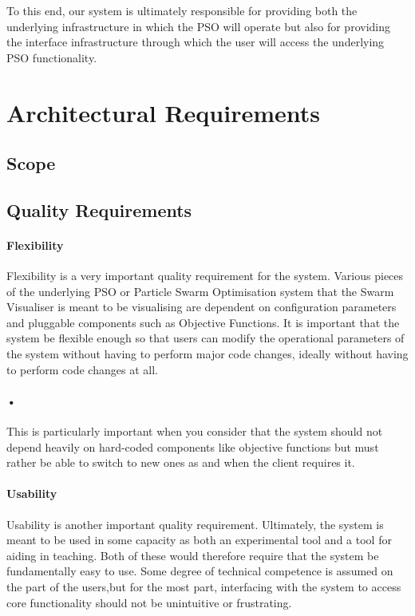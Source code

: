 \documentclass[11pt]{article}
\begin{document}
To this end, our system is ultimately responsible for providing both the underlying infrastructure in which the PSO will operate but also for providing the interface infrastructure through which the user will access the underlying PSO functionality.


\section{Architectural Requirements}
\subsection{Scope}
\subsection{Quality Requirements}

\paragraph{Flexibility}
Flexibility is a very important quality requirement for the system. Various pieces of the underlying PSO or Particle Swarm Optimisation system that the Swarm Visualiser is meant to be visualising are dependent on configuration parameters and pluggable components such as Objective Functions. It is important that the system be flexible enough so that users can modify the operational parameters of the system without having to perform major code changes, ideally without having to perform code changes at all.
\paragraph{•}
This is particularly important when you consider that the system should not depend heavily on hard-coded components like objective functions but must rather be able to switch to new ones as and when the client requires it.

\paragraph{Usability}
Usability is another important quality requirement. Ultimately, the system is meant to be used in some capacity as both an experimental tool and a tool for aiding in teaching. Both of these would therefore require that the system be fundamentally easy to use. Some degree of technical competence is assumed on the part of the users,but for the most part, interfacing with the system to access core functionality should not be unintuitive or frustrating. 
\end{document}

